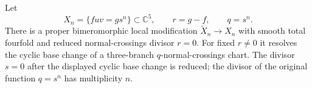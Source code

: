 \begin{proposition}\hypertarget{tag-030R}{}\label{push:src:B.4.22}
\label{push:B422}

Let
\[
 X_n=\{fuv=g s^n\}\subset\mathbb C^5,
 \qquad r=g-f,\qquad q=s^n.
\]
There is a proper bimeromorphic local modification
$\widetilde X_n\to X_n$ with smooth total fourfold
and reduced normal-crossings divisor $r=0$.
For fixed $r\ne0$ it resolves the cyclic base change
of a three-branch $q$-normal-crossings chart.
The divisor $s=0$ after the displayed cyclic base change
is reduced; the divisor of the original function $q=s^n$
has multiplicity $n$.
\end{proposition}



